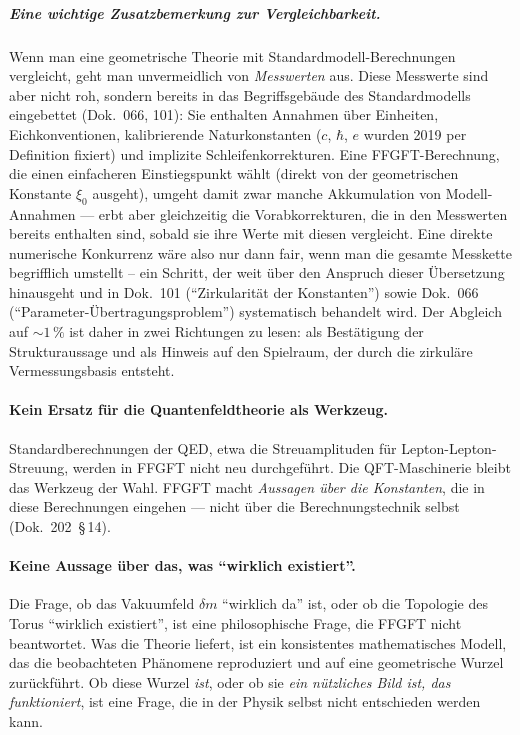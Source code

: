 \subparagraph{Eine wichtige Zusatzbemerkung zur Vergleichbarkeit.}
Wenn man eine geometrische Theorie mit Standardmodell-Berechnungen
vergleicht, geht man unvermeidlich von \emph{Messwerten} aus. Diese
Messwerte sind aber nicht roh, sondern bereits in das Begriffsgebäude
des Standardmodells eingebettet (Dok.~066, 101): Sie enthalten
Annahmen über Einheiten, Eichkonventionen, kalibrierende
Naturkonstanten ($c$, $\hbar$, $e$ wurden 2019 per Definition fixiert)
und implizite Schleifenkorrekturen. Eine FFGFT-Berechnung, die einen
einfacheren Einstiegspunkt wählt (direkt von der geometrischen
Konstante $\xi_0$ ausgeht), umgeht damit zwar manche Akkumulation von
Modell-Annahmen --- erbt aber gleichzeitig die Vorabkorrekturen, die
in den Messwerten bereits enthalten sind, sobald sie ihre Werte mit
diesen vergleicht. Eine direkte numerische Konkurrenz wäre also nur
dann fair, wenn man die gesamte Messkette begrifflich umstellt --
ein Schritt, der weit über den Anspruch dieser Übersetzung hinausgeht
und in Dok.~101 (\enquote{Zirkularität der Konstanten}) sowie
Dok.~066 (\enquote{Parameter-Übertragungsproblem}) systematisch
behandelt wird. Der Abgleich auf $\sim 1\,\%$ ist daher in zwei
Richtungen zu lesen: als Bestätigung der Strukturaussage und als
Hinweis auf den Spielraum, der durch die zirkuläre Vermessungsbasis
entsteht.

\paragraph{Kein Ersatz für die Quantenfeldtheorie als Werkzeug.}
Standardberechnungen der QED, etwa die Streuamplituden für
Lepton-Lepton-Streuung, werden in FFGFT nicht neu durchgeführt. Die
QFT-Maschinerie bleibt das Werkzeug der Wahl. FFGFT macht
\emph{Aussagen über die Konstanten}, die in diese Berechnungen
eingehen --- nicht über die Berechnungstechnik selbst (Dok.~202~\S\,14).

\paragraph{Keine Aussage über das, was \enquote{wirklich existiert}.}
Die Frage, ob das Vakuumfeld $\delta m$ \enquote{wirklich da} ist, oder
ob die Topologie des Torus \enquote{wirklich existiert}, ist eine
philosophische Frage, die FFGFT nicht beantwortet. Was die Theorie
liefert, ist ein konsistentes mathematisches Modell, das die
beobachteten Phänomene reproduziert und auf eine geometrische Wurzel
zurückführt. Ob diese Wurzel \emph{ist}, oder ob sie \emph{ein
nützliches Bild ist, das funktioniert}, ist eine Frage, die in der
Physik selbst nicht entschieden werden kann.

